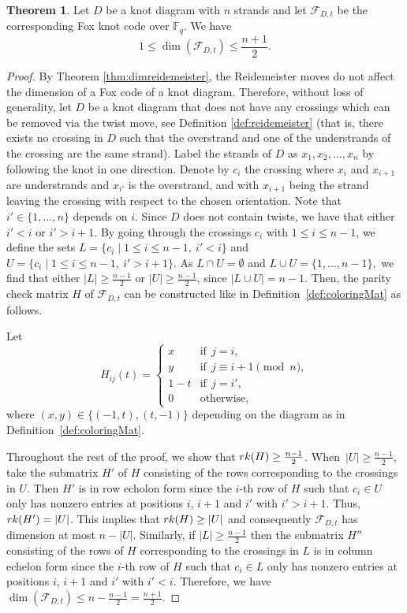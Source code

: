 \documentclass[11pt,a4paper]{article}
\theoremstyle{definition}
\newtheorem{theorem}{Theorem}[section]
\newcommand{\numberset}{\mathbb}
\newcommand{\F}{\numberset{F}}
\newcommand{\mF}{\mathcal{F}}
\newcommand{\rk}{\textnormal{rk}}
\begin{document}
\begin{theorem}
\label{thm:dimension-ineq}
Let $D$ be a knot diagram with $n$ strands and let $\mF_{D,t}$ be the corresponding Fox knot code over $\F_q$. We have
$$
1 \le \dim(\mF_{D,t}) \le \frac{n+1}{2} .
$$ 
\end{theorem}
\begin{proof}
By Theorem \ref{thm:dimreidemeister}, the Reidemeister moves do not affect the dimension of a Fox code of a knot diagram. Therefore, without loss of generality, let $D$ be a knot diagram that does not have any crossings which can be removed via the twist move, see Definition \ref{def:reidemeister} 
(that is, there exists no crossing in $D$ such that the overstrand and one of the understrands of the crossing are the same strand).  
Label the strands of $D$ as $x_1, x_2, ..., x_n$ by following the knot in one direction. Denote by $c_i$ the crossing where $x_i$ and $x_{i+1}$ are understrands and $x_{i'}$ is the overstrand, and with $x_{i+1}$ being the strand leaving the crossing with respect to the chosen orientation. Note that $i' \in \{1, \ldots, n\}$ depends on $i$. Since $D$ does not contain twists, we have that either $i' < i$ or $i' > i+1$. By going through the crossings $c_i$ with $1 \le i \le n-1$, we define the sets $L = \{ c_i \mid 1 \leq i \le n-1,\  i' < i\}$ and~$U= \{ c_i \mid 1 \leq i \le n-1,\  i' > i+1\}$. As $L \cap U = \emptyset$ and $L \cup U = \{1, \ldots, n-1\},$ we find that either $|L| \geq \frac{n-1}{2}$ or $|U| \geq \frac{n-1}{2}$, since $|L \cup U| = n-1.$ 
Then, the parity check matrix $H$ of $\mF_{D,t}$ can be constructed like in Definition~\ref{def:coloringMat} as follows. 

Let 
$$
H_{ij}(t) = 
\begin{cases}
x & \text{if} \ \ j=i,\\
y & \text{if} \ \ j \equiv i+1 \pmod n,\\
1-t & \text{if} \ \ j=i',\\
0 & \text{otherwise},
\end{cases}
$$ where $(x,y) \in \{(-1,t),(t,-1)\}$ depending on the diagram as in Definition~\ref{def:coloringMat}. 

Throughout the rest of the proof, we show that $\rk(H) \ge \frac{n-1}{2}$. When~$|U| \geq \frac{n-1}{2}$, take the submatrix $H'$ of $H$ consisting of the rows corresponding to the crossings in $U$. 
Then $H'$ is in row echolon form since the $i$-th row of $H$ such that $c_i \in U$ only has nonzero entries at positions $i$, $i + 1$ and $i'$ with $i' > i+1$. Thus, $\rk(H') = |U|$. This implies that $\rk(H) \ge |U|$ and consequently $\mF_{D,t}$ has dimension at most $n - |U|$. Similarly, if $|L| \geq \frac{n-1}{2}$ then the submatrix $H''$ consisting of the rows of $H$ corresponding to the crossings in $L$ is in column echelon form since the $i$-th row of $H$ such that $c_i \in L$ only has nonzero entries at positions $i$, $i + 1$ and $i'$ with $i' < i$. Therefore, we have $\dim(\mF_{D,t}) \leq n - \frac{n-1}{2} = \frac{n+1}{2}$.
\end{proof}
\end{document}
